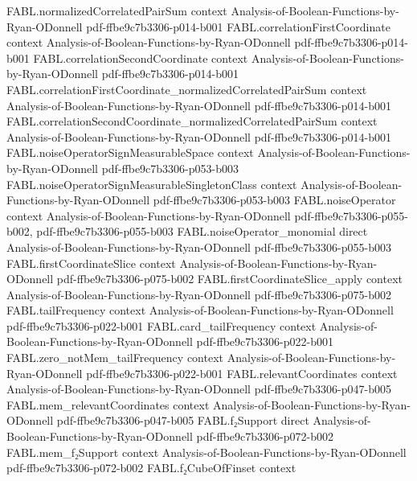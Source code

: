 \begin{theorem}
\proofstep
  {FABL.normalizedCorrelatedPairSum}
  {context}
  {Analysis-of-Boolean-Functions-by-Ryan-ODonnell}
  {pdf-ffbe9c7b3306-p014-b001}
\proofstep
  {FABL.correlationFirstCoordinate}
  {context}
  {Analysis-of-Boolean-Functions-by-Ryan-ODonnell}
  {pdf-ffbe9c7b3306-p014-b001}
\proofstep
  {FABL.correlationSecondCoordinate}
  {context}
  {Analysis-of-Boolean-Functions-by-Ryan-ODonnell}
  {pdf-ffbe9c7b3306-p014-b001}
\proofstep
  {FABL.correlationFirstCoordinate_normalizedCorrelatedPairSum}
  {context}
  {Analysis-of-Boolean-Functions-by-Ryan-ODonnell}
  {pdf-ffbe9c7b3306-p014-b001}
\proofstep
  {FABL.correlationSecondCoordinate_normalizedCorrelatedPairSum}
  {context}
  {Analysis-of-Boolean-Functions-by-Ryan-ODonnell}
  {pdf-ffbe9c7b3306-p014-b001}
\proofstep
  {FABL.noiseOperatorSignMeasurableSpace}
  {context}
  {Analysis-of-Boolean-Functions-by-Ryan-ODonnell}
  {pdf-ffbe9c7b3306-p053-b003}
\proofstep
  {FABL.noiseOperatorSignMeasurableSingletonClass}
  {context}
  {Analysis-of-Boolean-Functions-by-Ryan-ODonnell}
  {pdf-ffbe9c7b3306-p053-b003}
\proofstep
  {FABL.noiseOperator}
  {context}
  {Analysis-of-Boolean-Functions-by-Ryan-ODonnell}
  {pdf-ffbe9c7b3306-p055-b002,
    pdf-ffbe9c7b3306-p055-b003}
\proofstep
  {FABL.noiseOperator_monomial}
  {direct}
  {Analysis-of-Boolean-Functions-by-Ryan-ODonnell}
  {pdf-ffbe9c7b3306-p055-b003}
\proofstep
  {FABL.firstCoordinateSlice}
  {context}
  {Analysis-of-Boolean-Functions-by-Ryan-ODonnell}
  {pdf-ffbe9c7b3306-p075-b002}
\proofstep
  {FABL.firstCoordinateSlice_apply}
  {context}
  {Analysis-of-Boolean-Functions-by-Ryan-ODonnell}
  {pdf-ffbe9c7b3306-p075-b002}
\proofstep
  {FABL.tailFrequency}
  {context}
  {Analysis-of-Boolean-Functions-by-Ryan-ODonnell}
  {pdf-ffbe9c7b3306-p022-b001}
\proofstep
  {FABL.card_tailFrequency}
  {context}
  {Analysis-of-Boolean-Functions-by-Ryan-ODonnell}
  {pdf-ffbe9c7b3306-p022-b001}
\proofstep
  {FABL.zero_notMem_tailFrequency}
  {context}
  {Analysis-of-Boolean-Functions-by-Ryan-ODonnell}
  {pdf-ffbe9c7b3306-p022-b001}
\proofstep
  {FABL.relevantCoordinates}
  {context}
  {Analysis-of-Boolean-Functions-by-Ryan-ODonnell}
  {pdf-ffbe9c7b3306-p047-b005}
\proofstep
  {FABL.mem_relevantCoordinates}
  {context}
  {Analysis-of-Boolean-Functions-by-Ryan-ODonnell}
  {pdf-ffbe9c7b3306-p047-b005}
\proofstep
  {FABL.f₂Support}
  {direct}
  {Analysis-of-Boolean-Functions-by-Ryan-ODonnell}
  {pdf-ffbe9c7b3306-p072-b002}
\proofstep
  {FABL.mem_f₂Support}
  {context}
  {Analysis-of-Boolean-Functions-by-Ryan-ODonnell}
  {pdf-ffbe9c7b3306-p072-b002}
\proofstep
  {FABL.f₂CubeOfFinset}
  {context}

\end{theorem}
